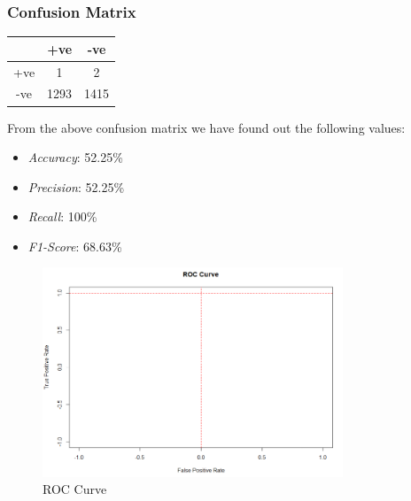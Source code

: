 \documentclass{article}
\begin{document}
\subsubsection{Confusion Matrix}
\centering
\begin{tabular}{|c|c|c|}
    \hline
    \multicolumn{1}{|c|}{} & +ve & -ve \\
    \hline
    +ve & 1 & 2 \\
    \hline
    -ve & 1293 & 1415 \\
    \hline
\end{tabular}

\raggedright
\vspace{.25cm}
From the above confusion matrix we have found out the following values:
\begin{itemize}
    \item \textit{Accuracy}: 52.25\%
    \item \textit{Precision}: 52.25\%
    \item \textit{Recall}: 100\%
    \item \textit{F1-Score}: 68.63\%
\end{itemize}

\begin{figure}[ht]
    \centering
    \includegraphics[width=0.8\textwidth]{./images/ROC Curve.png}
    \caption{ROC Curve}
    \label{img:6}
\end{figure}
\end{document}
